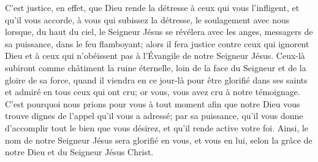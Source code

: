 C’est justice, en effet, que Dieu rende la détresse à ceux qui vous l’infligent,
	et qu’il vous accorde, à vous qui subissez la détresse, le soulagement avec nous
	lorsque, du haut du ciel, le Seigneur Jésus se révélera
	avec les anges, messagers de sa puissance, dans le feu flamboyant;
	alors il fera justice contre ceux qui ignorent Dieu
	et à ceux qui n’obéissent pas à l’Évangile de notre Seigneur Jésus.
Ceux-là subiront comme châtiment la ruine éternelle,
	loin de la face du Seigneur et de la gloire de sa force,
	quand il viendra en ce jour-là pour être glorifié dans ses saints
		et admiré en tous ceux qui ont cru;
	or vous, vous avez cru à notre témoignage.
C’est pourquoi nous prions pour vous à tout moment
	afin que notre Dieu vous trouve dignes de l’appel qu’il vous a adressé;
	par sa puissance, qu’il vous donne d’accomplir tout le bien que vous désirez,
	et qu’il rende active votre foi.
Ainsi, le nom de notre Seigneur Jésus sera glorifié en vous, et vous en lui,
	selon la grâce de notre Dieu et du Seigneur Jésus Christ.
